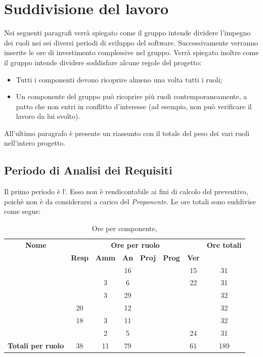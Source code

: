 \newpage
\section{Suddivisione del lavoro}
Nei seguenti paragrafi verrà spiegato come il gruppo intende dividere l'impegno dei ruoli nei sei diversi periodi di sviluppo del software. Successivamente verranno inserite le ore di investimento complessive nel gruppo. Verrà spiegato inoltre come il gruppo intende dividere soddisfare alcune regole del progetto:
\begin{itemize}
	\item Tutti i componenti devono ricoprire almeno una volta tutti i ruoli; 
	\item Un componente del gruppo può ricoprire più ruoli contemporaneamente, a patto che non entri in conflitto d'interesse (ad esempio, non può verificare il lavoro da lui svolto).
\end{itemize}

All'ultimo paragrafo è presente un riassunto con il totale del peso dei vari ruoli nell'intero progetto.

\subsection{Periodo di Analisi dei Requisiti}
Il primo periodo è l'\AdR. Esso non è rendicontabile ai fini di calcolo del preventivo, poichè non è da considerarsi a carico del \textit{Proponente}. Le ore totali sono suddivise come segue:

\begin{table}[H]
	\begin{center}
		\begin{tabular}{|c|c|c|c|c|c|c|c|}
			\hline
			\textbf{Nome} & \multicolumn{6}{c|}{\textbf{Ore per ruolo}} & \textbf{Ore totali} \\\cline{2-7}
			& \textbf{Resp} & \textbf{Amm} & \textbf{An} & \textbf{Proj} & \textbf{Prog} & \textbf{Ver} & \\
			\hline
			\MC			&		&		&	16	&		&		&	15	&	31	\\
			\hline
			\AN			&		&	3	&	6	&	 	&		&	22	& 	31	\\
			\hline
			\DAN		&		&	3	&	29	&		&		&		&	32	\\
			\hline
			\AS			&	20	&	 	&	12 	&		&	 	& 		&	32	\\
			\hline
			\NS 		&	18	&	3	&	11	&		&		& 		&	32	\\
			\hline
			\DS			& 		&	2	&	5	&		&		&	24	&	31	\\
			\hline
			\textbf{Totali per ruolo}	& 	38	&	11	&	79	&		&		&	61	&	189	\\
			\hline
		\end{tabular}
	\end{center}
	\caption{Ore per componente, \AdR}
\end{table}

